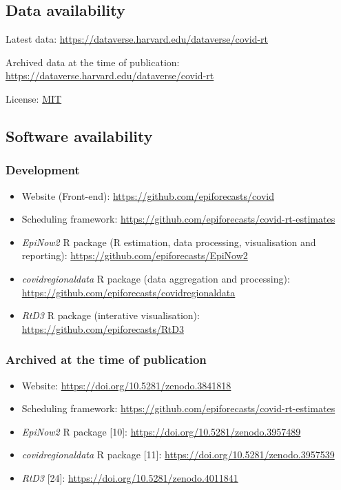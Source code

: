 \documentclass[
]{article}
\providecommand{\tightlist}{%
  \setlength{\itemsep}{0pt}\setlength{\parskip}{0pt}}
\begin{document}
\hypertarget{data-availability}{%
\subsection{Data availability}\label{data-availability}}

Latest data: \url{https://dataverse.harvard.edu/dataverse/covid-rt}

Archived data at the time of publication:
\url{https://dataverse.harvard.edu/dataverse/covid-rt}

License: \href{https://opensource.org/licenses/MIT}{MIT}

\hypertarget{software-availability}{%
\subsection{Software availability}\label{software-availability}}

\hypertarget{development}{%
\subsubsection{Development}\label{development}}

\begin{itemize}
\tightlist
\item
  Website (Front-end): \url{https://github.com/epiforecasts/covid}
\item
  Scheduling framework:
  \url{https://github.com/epiforecasts/covid-rt-estimates}
\item
  \emph{EpiNow2} R package (R estimation, data processing, visualisation
  and reporting): \url{https://github.com/epiforecasts/EpiNow2}
\item
  \emph{covidregionaldata} R package (data aggregation and processing):
  \url{https://github.com/epiforecasts/covidregionaldata}
\item
  \emph{RtD3} R package (interative visualisation):
  \url{https://github.com/epiforecasts/RtD3}
\end{itemize}

\hypertarget{archived-at-the-time-of-publication}{%
\subsubsection{Archived at the time of
publication}\label{archived-at-the-time-of-publication}}

\begin{itemize}
\tightlist
\item
  Website: \url{https://doi.org/10.5281/zenodo.3841818}
\item
  Scheduling framework:
  \url{https://github.com/epiforecasts/covid-rt-estimates}
\item
  \emph{EpiNow2} R package {[}10{]}:
  \url{https://doi.org/10.5281/zenodo.3957489}
\item
  \emph{covidregionaldata} R package {[}11{]}:
  \url{https://doi.org/10.5281/zenodo.3957539}
\item
  \emph{RtD3} {[}24{]}: \url{https://doi.org/10.5281/zenodo.4011841}
\end{itemize}
\end{document}
